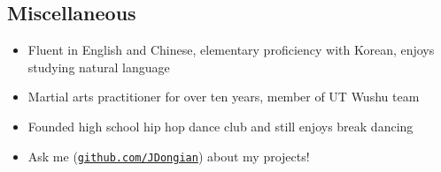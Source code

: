 \documentclass[line,margin]{res}
\begin{document}
\begin{resume}
\vspace{-8pt}
\section{Miscellaneous} 
    \vspace{22pt}
        \begin{itemize} \itemsep -2pt
        \item Fluent in English and Chinese, elementary proficiency with Korean, enjoys studying natural language
        \item Martial arts practitioner for over ten years, member of UT Wushu team
        \item Founded high school hip hop dance club and still enjoys break dancing
        \item Ask me (\href{https://www.github.com/JDongian}{\texttt{github.com/JDongian}}) about my projects! 
        \end{itemize}

\end{resume} 
\end{document}
